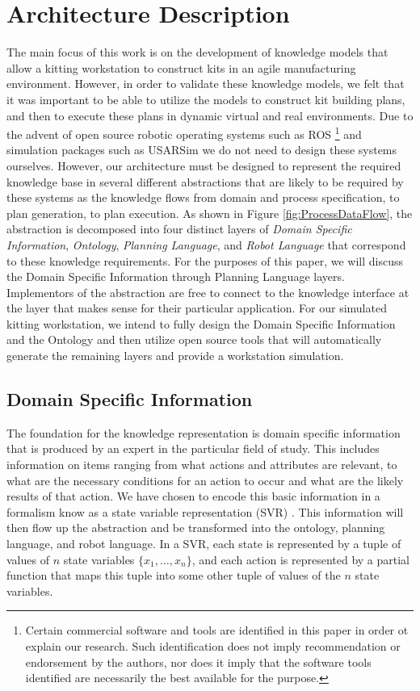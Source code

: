\section{Architecture Description}
\label{sect:Architecture}
The main focus of this work is on the development of knowledge models that allow a kitting workstation to construct kits
in an agile manufacturing environment. However, in order to validate these knowledge models, we felt that it was
important to be able to utilize the models to construct kit building plans, and then to execute these plans in dynamic
virtual and real environments. Due to the advent of open source robotic operating systems such as ROS \cite{ROS}
 \footnote{Certain commercial software and tools are identified in this paper in order ot explain our research. Such identification does not imply
recommendation or endorsement by the authors, nor does it imply that the software tools identified are necessarily the best available for the purpose.}
 and simulation
packages such as USARSim \cite{Balakirsky2007} we do not need to design these systems ourselves. However, our architecture must
be designed to represent the required knowledge base in several different abstractions that are likely to be
required by these systems as the knowledge flows from domain and process specification, to plan generation, to plan execution.
As shown in Figure \ref{fig:ProcessDataFlow}, the abstraction is decomposed into four
distinct layers of {\it Domain Specific Information}, {\it Ontology}, {\it Planning Language}, and {\it Robot Language} that correspond to these
knowledge requirements. For the purposes of this paper, we will discuss the Domain Specific Information through Planning Language layers. Implementors of the abstraction are free to connect to the knowledge interface at the layer that makes sense for
their particular application. For our simulated kitting workstation, we intend to fully design the Domain Specific Information and the Ontology and
then utilize open
source tools that will automatically generate the remaining layers and provide a workstation simulation.

\subsection{Domain Specific Information}
\label{subsect:DomainSpecific}
The foundation for the knowledge representation is domain specific information that is produced by an expert in the particular field of study. This includes
information on items ranging from what actions and attributes are relevant, to what are the necessary conditions for an action to occur and what are the
likely results of that action. We have chosen to encode this basic information in a formalism know as a state variable representation (SVR) \cite{NAU.2004}.
This information will then flow up the abstraction and be transformed into the ontology, planning language, and robot language.
In a SVR, each state is represented by a tuple of values of $n$ state variables $\lbrace x_1,\dots,x_n\rbrace$, and each action is represented by a partial function that maps this tuple into some other tuple of values of the $n$ state variables.

